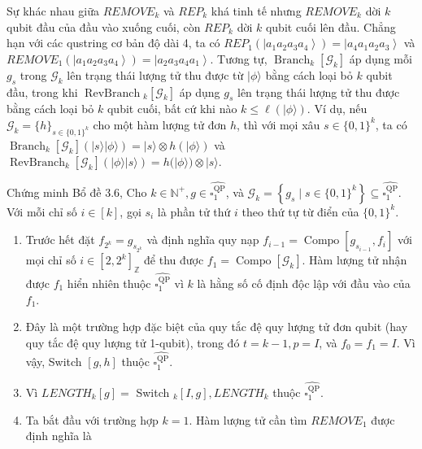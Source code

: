 \documentclass[10pt]{article}
\begin{document}
\begin{enumerate}
Sự khác nhau giữa $R E M O V E_{k}$ và $R E P_{k}$ khá tinh tế nhưng $R E M O V E_{k}$ dời $k$ qubit đầu của đầu vào xuống cuối, còn $R E P_{k}$ dời $k$ qubit cuối lên đầu. Chẳng hạn với các qustring cơ bản độ dài 4, ta có $R E P_{1}\left(\left|a_{1} a_{2} a_{3} a_{4}\right\rangle\right)=\left|a_{4} a_{1} a_{2} a_{3}\right\rangle$ và $R E M O V E_{1}\left(\left|a_{1} a_{2} a_{3} a_{4}\right\rangle\right)=\left|a_{2} a_{3} a_{4} a_{1}\right\rangle$. Tương tự, $\operatorname{Branch}_{k}\left[\mathcal{G}_{k}\right]$ áp dụng mỗi $g_{s}$ trong $\mathcal{G}_{k}$ lên trạng thái lượng tử thu được từ $|\phi\rangle$ bằng cách loại bỏ $k$ qubit đầu, trong khi $\operatorname{RevBranch}{ }_{k}\left[\mathcal{G}_{k}\right]$ áp dụng $g_{s}$ lên trạng thái lượng tử thu được bằng cách loại bỏ $k$ qubit cuối, bất cứ khi nào $k \leq \ell(|\phi\rangle)$. Ví dụ, nếu $\mathcal{G}_{k}=\{h\}_{s \in\{0,1\}^{k}}$ cho một hàm lượng tử đơn $h$, thì với mọi xâu $s \in\{0,1\}^{k}$, ta có $\operatorname{Branch}_{k}\left[\mathcal{G}_{k}\right](|s\rangle|\phi\rangle)=|s\rangle \otimes h(|\phi\rangle)$ và $\operatorname{RevBranch}_{k}\left[\mathcal{G}_{k}\right](|\phi\rangle|s\rangle)=h(|\phi\rangle) \otimes|s\rangle$.
\end{enumerate}

Chứng minh Bổ đề 3.6, Cho $k \in \mathbb{N}^{+}, g \in \widehat{\square_{1}^{\mathrm{QP}}}$, và $\mathcal{G}_{k}=\left\{g_{s} \mid s \in\{0,1\}^{k}\right\} \subseteq \widehat{\square_{1}^{\mathrm{QP}}}$. Với mỗi chỉ số $i \in[k]$, gọi $s_{i}$ là phần tử thứ $i$ theo thứ tự từ điển của $\{0,1\}^{k}$.

\begin{enumerate}
  \item Trước hết đặt $f_{2^{k}}=g_{s_{2^{k}}}$ và định nghĩa quy nạp $f_{i-1}=\operatorname{Compo}\left[g_{s_{i-1}}, f_{i}\right]$ với mọi chỉ số $i \in\left[2,2^{k}\right]_{\mathbb{Z}}$ để thu được $f_{1}=\operatorname{Compo}\left[\mathcal{G}_{k}\right]$. Hàm lượng tử nhận được $f_{1}$ hiển nhiên thuộc $\widehat{\square_{1}^{\mathrm{QP}}}$ vì $k$ là hằng số cố định độc lập với đầu vào của $f_{1}$.
  \item Đây là một trường hợp đặc biệt của quy tắc đệ quy lượng tử đơn qubit (hay quy tắc đệ quy lượng tử 1-qubit), trong đó $t=k-1, p=I$, và $f_{0}=f_{1}=I$. Vì vậy, Switch $[g, h]$ thuộc $\widehat{\square_{1}^{\mathrm{QP}}}$.
  \item Vì $L E N G T H_{k}[g]=$ Switch $_{k}[I, g], L E N G T H_{k}$ thuộc $\widehat{\square_{1}^{\mathrm{QP}}}$.
  \item Ta bắt đầu với trường hợp $k=1$. Hàm lượng tử cần tìm $R E M O V E_{1}$ được định nghĩa là
\end{enumerate}
\end{document}
